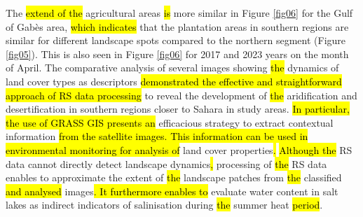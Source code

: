 \documentclass[land,article,submit,pdftex,moreauthors]{Definitions/mdpi}
\begin{document}
The \hl{extend of the }agricultural areas \hl{is }more similar in Figure \ref{fig06} for the Gulf of Gabès area, \hl{which indicates} that the plantation areas in southern regions are\hl{ }similar for different landscape spots compared to the northern segment (Figure \ref{fig05}). This is also seen in Figure \ref{fig06} for 2017 and 2023 years on the month of April. The\hl{ }comparative analysis of several images showing \hl{the }dynamics of land cover types as descriptors \hl{demonstrated the effective and straightforward approach of RS data processing }to reveal the development of \hl{the }aridification and desertification in southern regions closer to Sahara in study areas. \hl{In particular, the use of GRASS GIS presents an} efficacious strategy to extract contextual information \hl{from the satellite images. This information can be used in environmental monitoring for analysis of }land cover properties\hl{. }\hl{Although the} RS data cannot directly detect landscape dynamics\hl{, }processing of \hl{the }RS data enables to approximate the extent of \hl{the }landscape patches from \hl{the }classified \hl{and analysed }images\hl{. It furthermore enables to} evaluate water content in salt lakes as indirect indicators of salinisation during \hl{the }summer heat \hl{period}.
\end{document}
